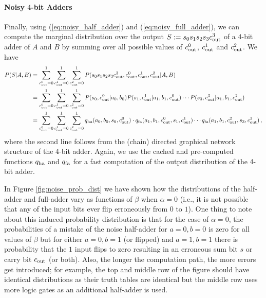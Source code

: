 \paragraph{Noisy $4$-bit Adders} Finally, using (\ref{eq:noisy_half_adder}) and (\ref{eq:noisy_full_adder}), we can compute the marginal distribution over the output $S:=s_0s_1s_2s_3c_{\mathrm{out}}^3$ of a $4$-bit adder of $A$ and $B$ by summing over all possible values of $c_{\mathrm{out}}^0$, $c_{\mathrm{out}}^1$ and $c_{\mathrm{out}}^2$. We have
\begin{align}
    P(S|A,B) & = \sum_{c_{\mathrm{out}}^0=0}^1 \sum_{c_{\mathrm{out}}^1=0}^1 \sum_{c_{\mathrm{out}}^2=0}^1 P(s_0s_1s_2s_3c_{\mathrm{out}}^3,c_{\mathrm{out}}^0,c_{\mathrm{out}}^1,c_{\mathrm{out}}^2|A,B) \nonumber \\
             & = \sum_{c_{\mathrm{out}}^0=0}^1 \sum_{c_{\mathrm{out}}^1=0}^1 \sum_{c_{\mathrm{out}}^2=0}^1 P(s_0,c_{\mathrm{out}}^0|a_0,b_0)P(s_1,c_{\mathrm{out}}^1|a_1,b_1,c_{\mathrm{out}}^0)\cdots P(s_3,c_{\mathrm{out}}^3|a_1,b_1,c_{\mathrm{out}}^2) \nonumber \\
             & = \sum_{c_{\mathrm{out}}^0=0}^1 \sum_{c_{\mathrm{out}}^1=0}^1 \sum_{c_{\mathrm{out}}^2=0}^1 q_{\mathrm{ha}}(a_0,b_0,s_0,c_{\mathrm{out}}^0)\cdot q_{\mathrm{fa}}(a_1,b_1,c_{\mathrm{out}}^0,s_1,c_{\mathrm{out}}^1)\cdots q_{\mathrm{fa}}(a_1,b_1,c_{\mathrm{out}}^2,s_3,c_{\mathrm{out}}^3) \nonumber \,,
\end{align}
where the second line follows from the (chain) directed graphical network structure of the 4-bit adder. Again, we use the cached and pre-computed functions $q_{\mathrm{ha}}$ and $q_{\mathrm{fa}}$ for a fast computation of the output distribution of the 4-bit adder.

In Figure \ref{fig:noise_prob_dist} we have shown how the distributions of the half-adder and full-adder vary as functions of $\beta$ when $\alpha=0$ (i.e., it is not possible that any of the input bits ever flip erroneously from $0$ to $1$). One thing to note about this induced probability distribution is that for the case of $\alpha=0$, the probabilities of a mistake of the noise half-adder for $a=0, b=0$ is zero for all values of $\beta$ but for either $a=0, b=1$ (or flipped) and $a=1, b=1$ there is probability that the $1$ input flips to zero resulting in an erroneous sum bit $s$ or carry bit $c_{\mathrm{out}}$ (or both). Also, the longer the computation path, the more errors get introduced; for example, the top and middle row of the figure should have identical distributions as their truth tables are identical but the middle row uses more logic gates as an additional half-adder is used.


